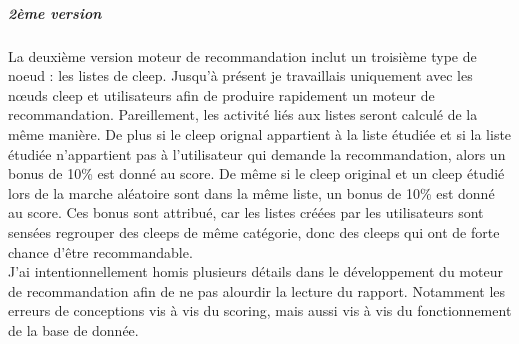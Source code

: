 \documentclass{article} %
\begin{document}
\subparagraph{2ème version\\}
La deuxième version moteur de recommandation inclut un troisième type de noeud : les listes de cleep. Jusqu'à présent je travaillais uniquement avec les nœuds cleep et utilisateurs afin de produire rapidement un moteur de recommandation. Pareillement, les activité liés aux listes seront calculé de la même manière. De plus si le cleep orignal appartient à la liste étudiée et si la liste étudiée n'appartient pas à l'utilisateur qui demande la recommandation,  alors un bonus de 10\% est donné au score. De même si le cleep original et un cleep étudié lors de la marche aléatoire sont dans la même liste, un bonus de 10\% est donné au score. Ces bonus sont attribué, car les listes créées par les utilisateurs sont sensées regrouper des cleeps de même catégorie, donc des cleeps qui ont de forte chance d'être recommandable.\\

J'ai intentionnellement homis plusieurs détails dans le développement du moteur de recommandation afin de ne pas alourdir la lecture du rapport. Notamment les erreurs de conceptions vis à vis du scoring, mais aussi vis à vis du fonctionnement de la base de donnée.
\end{document}
